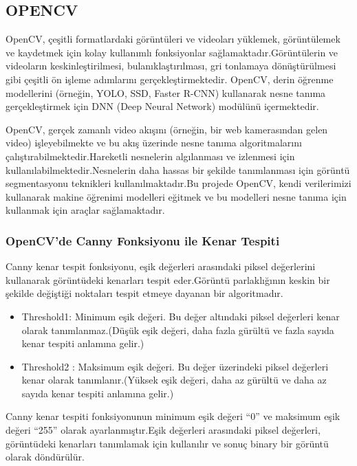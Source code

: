 \documentclass[11pt,a4paper]{report}
\begin{document}
   \subsection{OPENCV}
   \begin{justify}
   OpenCV, çeşitli formatlardaki görüntüleri ve videoları yüklemek, görüntülemek ve kaydetmek için kolay kullanımlı fonksiyonlar sağlamaktadır.Görüntülerin ve videoların keskinleştirilmesi, bulanıklaştırılması, gri tonlamaya dönüştürülmesi gibi çeşitli ön işleme adımlarını gerçekleştirmektedir. OpenCV, derin öğrenme modellerini (örneğin, YOLO, SSD, Faster R-CNN) kullanarak nesne tanıma gerçekleştirmek için DNN (Deep Neural Network) modülünü içermektedir.
   \newline
   
   OpenCV, gerçek zamanlı video akışını (örneğin, bir web kamerasından gelen video) işleyebilmekte ve bu akış üzerinde nesne tanıma algoritmalarını çalıştırabilmektedir.Hareketli nesnelerin algılanması ve izlenmesi için kullanılabilmektedir.Nesnelerin daha hassas bir şekilde tanımlanması için görüntü segmentasyonu teknikleri kullanılmaktadır.Bu projede OpenCV, kendi verilerimizi kullanarak makine öğrenimi modelleri eğitmek ve bu modelleri nesne tanıma için kullanmak için araçlar sağlamaktadır.
   \subsubsection{OpenCV’de Canny Fonksiyonu ile Kenar Tespiti}
   
   Canny kenar tespit fonksiyonu, eşik değerleri arasındaki piksel değerlerini kullanarak görüntüdeki kenarları tespit eder.Görüntü parlaklığının keskin bir şekilde değiştiği noktaları tespit etmeye dayanan bir algoritmadır.
   \begin{itemize}
   	\item Threshold1: Minimum eşik değeri. Bu değer altındaki piksel değerleri kenar olarak tanımlanmaz.(Düşük eşik değeri, daha fazla gürültü ve fazla sayıda kenar tespiti anlamına gelir.)
   	\item Threshold2 : Maksimum eşik değeri. Bu değer üzerindeki piksel değerleri kenar olarak tanımlanır.(Yüksek eşik değeri, daha az gürültü ve daha az sayıda kenar tespiti anlamına gelir.)\newline
   \end{itemize}
   
   	Canny kenar tespiti fonksiyonunun minimum eşik değeri “0” ve maksimum eşik değeri “255” olarak ayarlanmıştır.Eşik değerleri arasındaki piksel değerleri, görüntüdeki kenarları tanımlamak için kullanılır ve sonuç binary bir görüntü olarak döndürülür.
   \newline
   

\end{justify}
\end{document}

